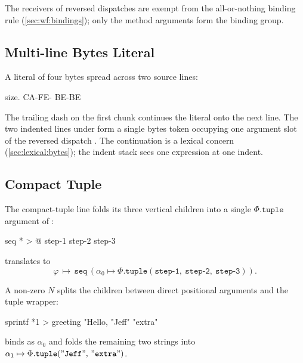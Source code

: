 The receivers of reversed dispatches are exempt from the all-or-nothing
  binding rule (\cref{sec:wf:bindings}); only the method arguments form
  the binding group.

\subsection{Multi-line Bytes Literal}\label{app:ex:bytes}

A  literal of four bytes spread across two source lines:

\begin{ffcode}
size.
  CA-FE-
  BE-BE
\end{ffcode}

The trailing dash on the first chunk continues the literal onto the next
  line.
The two indented lines under  form a single bytes token
   occupying one argument slot of the reversed dispatch
  .
The continuation is a lexical concern (\cref{sec:lexical:bytes}); the
  indent stack sees one expression at one indent.

\subsection{Compact Tuple}\label{app:ex:tuple}

The compact-tuple line  folds its three vertical children
  into a single \(\Phi.\mathtt{tuple}\) argument of :

\begin{ffcode}
seq * > @
  step-1
  step-2
  step-3
\end{ffcode}

translates to
\begin{equation*}
  \varphi\,\mapsto\,
    \mathtt{seq}\,(
      \alpha_0 \mapsto \Phi.\mathtt{tuple}(\mathtt{step\text{-}1},\ \mathtt{step\text{-}2},\ \mathtt{step\text{-}3})
    ).
\end{equation*}

A non-zero \(N\) splits the children between direct positional arguments
  and the tuple wrapper:

\begin{ffcode}
sprintf *1 > greeting
  "Hello, %
  "Jeff"
  "extra"
\end{ffcode}

binds  as \(\alpha_0\) and folds the remaining two
  strings into \(\alpha_1 \mapsto \Phi.\mathtt{tuple}(\mathtt{"Jeff"},\,\mathtt{"extra"})\).

